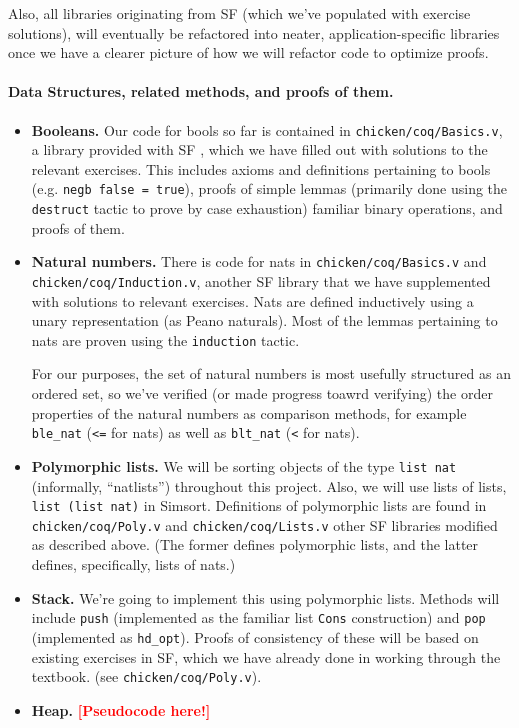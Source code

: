 \documentclass{article}
\newcommand{\todo}[1]{\textcolor{red}{\textbf{\textsf{[#1]}}}}
\begin{document}
Also, all libraries originating from SF \cite{sf} (which we've populated
with exercise solutions), will eventually be refactored into neater,
application-specific libraries once we have a clearer picture of how
we will refactor code to optimize proofs.

\paragraph{Data Structures, related methods, and proofs of them.}

\begin{itemize}
  \item \textbf{Booleans.}
Our code for bools so far is contained in \verb`chicken/coq/Basics.v`,
a library provided with SF \cite{sf}, which we have filled out with solutions
to the relevant exercises.
This includes axioms and definitions pertaining to bools
(e.g. \verb+negb false = true+), proofs of simple lemmas (primarily done
using the \verb+destruct+ tactic to prove by case exhaustion)
familiar binary operations, and proofs of them.

  \item \textbf{Natural numbers.}
    There is code for nats in \verb|chicken/coq/Basics.v| and
    \verb|chicken/coq/Induction.v|, another SF library that we have
    supplemented with solutions to relevant exercises.
    Nats are defined inductively using a unary representation
    (as Peano naturals).
    Most of the lemmas pertaining to nats are proven using
    the \verb+induction+ tactic.

    For our purposes, the set of natural numbers is most usefully
    structured as an ordered set, so we've verified (or made progress
    toawrd verifying) the order properties of the natural numbers
    as comparison methods, for example
    \verb`ble_nat` (\verb`<=` for nats) as well as \verb`blt_nat` (\verb`<` for nats).

  \item \textbf{Polymorphic lists.}
We will be sorting objects of the type \verb`list nat` (informally,
``natlists'') throughout this project.
Also, we will use lists of lists, \verb`list (list nat)` in Simsort.
Definitions of polymorphic lists are found in \verb`chicken/coq/Poly.v`
and \verb`chicken/coq/Lists.v`
other SF libraries modified as described above.
(The former defines polymorphic lists,
and the latter defines, specifically, lists of nats.)

  \item \textbf{Stack.}
    We're going to implement this using polymorphic lists.
    Methods will include \verb`push` (implemented as the familiar list \verb`Cons` construction) and \verb`pop` (implemented as \verb`hd_opt`). Proofs of consistency of these will be based on existing exercises in SF, which we have already done in working through the textbook. (see \verb`chicken/coq/Poly.v`).

  \item \textbf{Heap.}
    \todo{Pseudocode here!}

\end{itemize}
\end{document}

